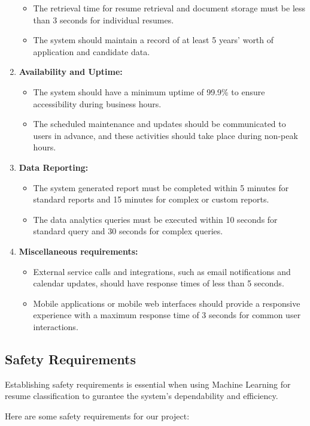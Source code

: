 \begin{enumerate}
\begin{itemize}
			\item The retrieval time for resume retrieval and document storage must be less than 3 seconds for individual resumes.
			\item The system should maintain a record of at least 5 years' worth of application and candidate data.
		\end{itemize}
    \item \textbf{Availability and Uptime:}
		\begin{itemize}
			\item The system should have a minimum uptime of 99.9\% to ensure accessibility during business hours.
			\item The scheduled maintenance and updates should be communicated to users in advance, and these activities should take place during non-peak hours.
		\end{itemize}
    \item \textbf{Data Reporting:}
		\begin{itemize}
			\item The system generated report must be completed within 5 minutes for standard reports and 15 minutes for complex or custom reports.
			\item The data analytics queries must be executed within 10 seconds for standard query and 30 seconds for complex queries.
		\end{itemize}
    \item \textbf{Miscellaneous requirements:}
		\begin{itemize}
			\item External service calls and integrations, such as email notifications and calendar updates, should have response times of less than 5 seconds.
			\item Mobile applications or mobile web interfaces should provide a responsive experience with a maximum response time of 3 seconds for common user interactions.
		\end{itemize}
\end{enumerate}


\subsection{Safety Requirements}

Establishing safety requirements is essential when using Machine Learning for resume classification to gurantee the system's dependability and efficiency. 

Here are some safety requirements for our project: 

